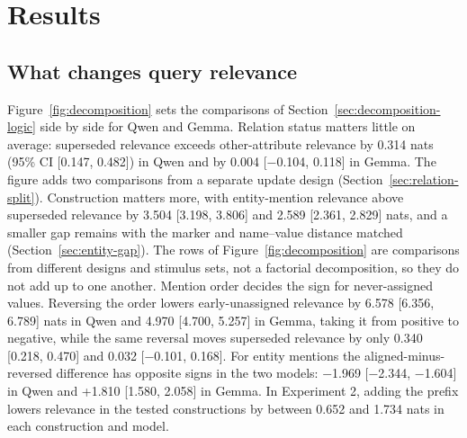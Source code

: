 \section{Results}
\label{sec:results}

\subsection{What changes query relevance}
\label{sec:main-findings}

Figure~\ref{fig:decomposition} sets the comparisons of Section~\ref{sec:decomposition-logic} side by side for Qwen and Gemma. Relation status matters little on average: superseded relevance exceeds other-attribute relevance by 0.314 nats (95\% CI [0.147, 0.482]) in Qwen and by 0.004 [−0.104, 0.118] in Gemma. The figure adds two comparisons from a separate update design (Section~\ref{sec:relation-split}). Construction matters more, with entity-mention relevance above superseded relevance by 3.504 [3.198, 3.806] and 2.589 [2.361, 2.829] nats, and a smaller gap remains with the marker and name--value distance matched (Section~\ref{sec:entity-gap}). The rows of Figure~\ref{fig:decomposition} are comparisons from different designs and stimulus sets, not a factorial decomposition, so they do not add up to one another. Mention order decides the sign for never-assigned values. Reversing the order lowers early-unassigned relevance by 6.578 [6.356, 6.789] nats in Qwen and 4.970 [4.700, 5.257] in Gemma, taking it from positive to negative, while the same reversal moves superseded relevance by only 0.340 [0.218, 0.470] and 0.032 [−0.101, 0.168]. For entity mentions the aligned-minus-reversed difference has opposite signs in the two models: −1.969 [−2.344, −1.604] in Qwen and +1.810 [1.580, 2.058] in Gemma. In Experiment 2, adding the prefix  lowers relevance in the tested constructions by between 0.652 and 1.734 nats in each construction and model.

